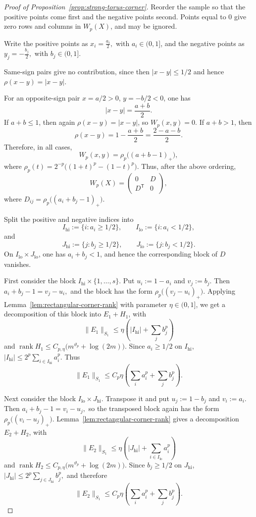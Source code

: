 \documentclass[11pt]{article}
\theoremstyle{definition}
\begin{document}
\begin{proof}[Proof of Proposition~\ref{prop:strong-torus-corner}]
Reorder the sample so that the positive points come first and the negative
points second. Points equal to \(0\) give zero rows and columns in \(W_p(X)\), and
may be ignored.

Write the positive points as
\(
x_i=\frac{a_i}{2},\) with \(a_i\in(0,1] \),
and the negative points as
\(
y_j=-\frac{b_j}{2},\) with \(b_j\in(0,1].\)

Same-sign pairs give no contribution, since then \(|x-y|\le1/2\) and hence
\(\rho(x-y)=|x-y|\).

For an opposite-sign pair \(x=a/2>0\), \(y=-b/2<0\), one has
\[
|x-y|=\frac{a+b}{2}.
\]
If \(a+b\le1\), then again \(\rho(x-y)=|x-y|\), so \(W_p(x,y)=0\). If
\(a+b>1\), then
\[
\rho(x-y)=1-\frac{a+b}{2}=\frac{2-a-b}{2}.
\]
Therefore, in all cases,
\[
W_p(x,y)
=
\rho_p\bigl((a+b-1)_+\bigr),
\]
where
\(
\rho_p(t)=2^{-p}\bigl((1+t)^p-(1-t)^p\bigr).
\) Thus, after the above ordering,
\[
W_p(X)=
\begin{pmatrix}
0&D\\
D^{\mathsf T}&0
\end{pmatrix},
\]
where
\(
D_{ij}=\rho_p\bigl((a_i+b_j-1)_+\bigr).
\)

Split the positive and negative indices into
\[
I_{\mathrm{hi}}:=\{i:a_i\ge1/2\},
\qquad
I_{\mathrm{lo}}:=\{i:a_i<1/2\},
\]
and
\[
J_{\mathrm{hi}}:=\{j:b_j\ge1/2\},
\qquad
J_{\mathrm{lo}}:=\{j:b_j<1/2\}.
\]
On \(I_{\mathrm{lo}}\times J_{\mathrm{lo}}\), one has \(a_i+b_j<1\), and hence
the corresponding block of \(D\) vanishes.

First consider the block \(I_{\mathrm{hi}}\times\{1,\dots,s\}\). Put
\(
u_i:=1-a_i\) and
\(
v_j:=b_j.
\)
Then
\(
a_i+b_j-1=v_j-u_i,
\)
and the block has the form
\(
\rho_p\bigl((v_j-u_i)_+\bigr).
\)
Applying Lemma~\ref{lem:rectangular-corner-rank} with parameter \(\eta\in(0,1]\),
we get a decomposition of this block into \(E_1+H_1\), with
\[
\|E_1\|_{S_1}
\le
\eta\left(|I_{\mathrm{hi}}|+\sum_jb_j^p\right)
\]
and
\(
\operatorname{rank}H_1
\le
C_{p,\eta}\bigl(m^{\vartheta_p}+\log(2m)\bigr).
\)
Since \(a_i\ge1/2\) on \(I_{\mathrm{hi}}\),
\(
|I_{\mathrm{hi}}|
\le
2^p\sum_{i\in I_{\mathrm{hi}}}a_i^p.
\)
Thus
\[
\|E_1\|_{S_1}
\le
C_p\eta\left(\sum_i a_i^p+\sum_j b_j^p\right).
\]

Next consider the block \(I_{\mathrm{lo}}\times J_{\mathrm{hi}}\). Transpose it
and put
\(
u_j:=1-b_j\) and
\(
v_i:=a_i.
\)
Then
\(
a_i+b_j-1=v_i-u_j,
\)
so the transposed block again has the form
\(
\rho_p\bigl((v_i-u_j)_+\bigr).
\)
Lemma~\ref{lem:rectangular-corner-rank} gives a decomposition \(E_2+H_2\), with
\[
\|E_2\|_{S_1}
\le
\eta\left(|J_{\mathrm{hi}}|+\sum_{i\in I_{\mathrm{lo}}}a_i^p\right)
\]
and
\(
\operatorname{rank}H_2
\le
C_{p,\eta}\bigl(m^{\vartheta_p}+\log(2m)\bigr).
\)
Since \(b_j\ge1/2\) on \(J_{\mathrm{hi}}\),
\(
|J_{\mathrm{hi}}|
\le
2^p\sum_{j\in J_{\mathrm{hi}}}b_j^p,
\)
and therefore
\[
\|E_2\|_{S_1}
\le
C_p\eta\left(\sum_i a_i^p+\sum_j b_j^p\right).
\]


\end{proof}
\end{document}
